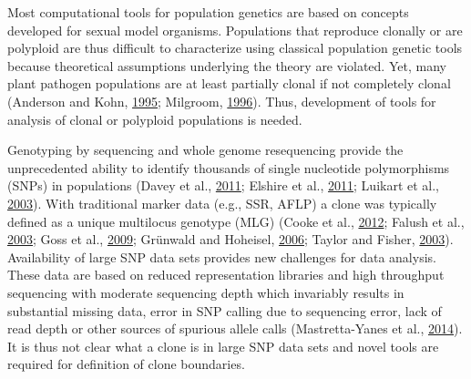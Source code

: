 \documentclass[double,12pt]{beavtex}
\begin{document}
  Most computational tools for population genetics are based on concepts
  developed for sexual model organisms. Populations that reproduce
  clonally or are polyploid are thus difficult to characterize using
  classical population genetic tools because theoretical assumptions
  underlying the theory are violated. Yet, many plant pathogen populations
  are at least partially clonal if not completely clonal (Anderson and
  Kohn, \protect\hyperlink{ref-anderson1995clonality}{1995}; Milgroom,
  \protect\hyperlink{ref-milgroom1996recombination}{1996}). Thus,
  development of tools for analysis of clonal or polyploid populations is
  needed.
  
  Genotyping by sequencing and whole genome resequencing provide the
  unprecedented ability to identify thousands of single nucleotide
  polymorphisms (SNPs) in populations (Davey et al.,
  \protect\hyperlink{ref-davey2011genome}{2011}; Elshire et al.,
  \protect\hyperlink{ref-elshire2011robust}{2011}; Luikart et al.,
  \protect\hyperlink{ref-luikart2003power}{2003}). With traditional marker
  data (e.g., SSR, AFLP) a clone was typically defined as a unique
  multilocus genotype (MLG) (Cooke et al.,
  \protect\hyperlink{ref-cooke2012genome}{2012}; Falush et al.,
  \protect\hyperlink{ref-Falush01082003}{2003}; Goss et al.,
  \protect\hyperlink{ref-goss2009population}{2009}; Grünwald and Hoheisel,
  \protect\hyperlink{ref-grunwald2006hierarchical}{2006}; Taylor and
  Fisher, \protect\hyperlink{ref-taylor2003fungal}{2003}). Availability of
  large SNP data sets provides new challenges for data analysis. These
  data are based on reduced representation libraries and high throughput
  sequencing with moderate sequencing depth which invariably results in
  substantial missing data, error in SNP calling due to sequencing error,
  lack of read depth or other sources of spurious allele calls
  (Mastretta-Yanes et al.,
  \protect\hyperlink{ref-mastretta2015restriction}{2014}). It is thus not
  clear what a clone is in large SNP data sets and novel tools are
  required for definition of clone boundaries.
  
\end{document}

